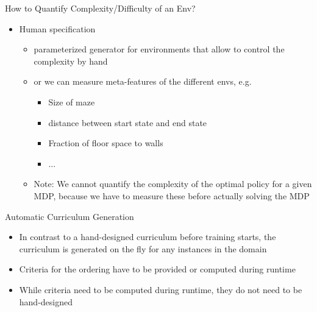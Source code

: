 \documentclass[aspectratio=169]{../latex_main/tntbeamer}  %
\begin{document}
\begin{frame}[c]{How to Quantify Complexity/Difficulty of an Env?}
	
	\begin{itemize}
		\item Human specification
		\begin{itemize}
			\item parameterized generator for environments that allow to control the complexity by hand
			\item or we can measure meta-features of the different envs, e.g.
			\begin{itemize}
				\item Size of maze
				\item distance between start state and end state
				\item Fraction of floor space to walls
				\item ...
			\end{itemize}
			\item Note: We cannot quantify the complexity of the optimal policy for a given MDP, because we have to measure these before actually solving the MDP
		\end{itemize}
	\end{itemize}
	

\end{frame}
\begin{frame}[c]{Automatic Curriculum Generation}
	
	\begin{itemize}
		\item In contrast to a hand-designed curriculum before training starts, the curriculum is generated on the fly for any instances in the domain
		\item Criteria for the ordering have to be provided or computed during runtime
		\item While criteria need to be computed during runtime, they do not need to be hand-designed
	\end{itemize}
	
\end{frame}
\end{document}
